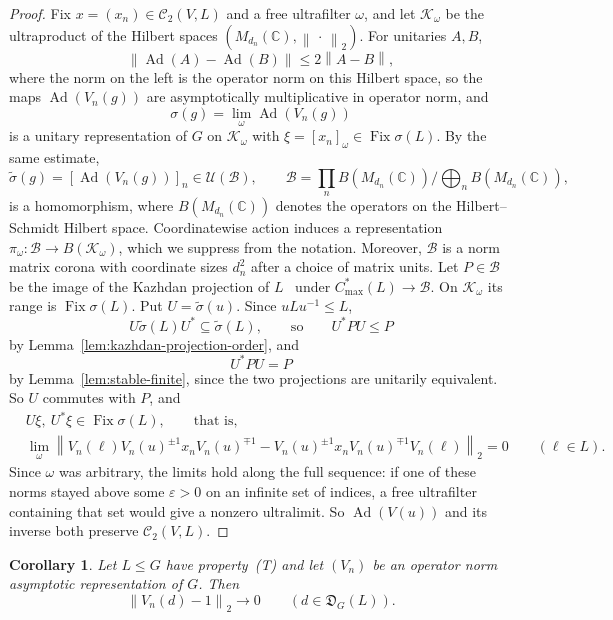 \documentclass[11pt]{amsart}
\newcommand{\leanverified}[2]{\ignorespaces}
\newtheorem{corollary}[theorem]{Corollary}
\theoremstyle{plain}
\newcommand{\C}{\mathbb C}
\newcommand{\U}{\mathcal U}
\newcommand{\opnorm}[1]{\left\lVert #1\right\rVert}
\newcommand{\hsnorm}[1]{\left\lVert #1\right\rVert_2}
\begin{document}
\begin{proof}
Fix $x=(x_n)\in\mathcal C_2(V,L)$ and a free ultrafilter $\omega$, and let
$\mathcal K_\omega$ be the ultraproduct of the Hilbert spaces
$(M_{d_n}(\C),\hsnorm{\,\cdot\,})$.  For unitaries $A,B$,
\[
 \opnorm{\operatorname{Ad}(A)-\operatorname{Ad}(B)}\le2\opnorm{A-B},
\]
where the norm on the left is the operator norm on this Hilbert space,
so the maps $\operatorname{Ad}(V_n(g))$ are asymptotically multiplicative
in operator norm, and
\[
 \sigma(g)=\lim_\omega\operatorname{Ad}(V_n(g))
\]
is a unitary representation of $G$ on $\mathcal K_\omega$ with
$\xi=[x_n]_\omega\in\operatorname{Fix}\sigma(L)$.  By the same estimate,
\[
 \widetilde\sigma(g)=[\operatorname{Ad}(V_n(g))]_n\in\U(\mathcal B),
 \qquad
 \mathcal B=\prod_nB(M_{d_n}(\C))\big/\bigoplus_nB(M_{d_n}(\C)),
\]
is a homomorphism, where $B(M_{d_n}(\C))$ denotes the operators on the
Hilbert--Schmidt Hilbert space.  Coordinatewise action induces a
representation $\pi_\omega\colon\mathcal B\to B(\mathcal K_\omega)$, which
we suppress from the notation.  Moreover, $\mathcal B$ is a norm matrix
corona with coordinate sizes $d_n^2$ after a choice of matrix units.  Let
$P\in\mathcal B$ be the image of the Kazhdan projection of
$L$~\cite{AkemannWalter} under
$C^*_{\max}(L)\to\mathcal B$.  On $\mathcal K_\omega$ its range is
$\operatorname{Fix}\sigma(L)$.  Put $U=\widetilde\sigma(u)$.  Since
$uLu^{-1}\le L$,
\[
 U\widetilde\sigma(L)U^*\subseteq\widetilde\sigma(L),
 \qquad\text{so}\qquad
 U^*PU\le P
\]
by Lemma~\ref{lem:kazhdan-projection-order}, and
\[
 U^*PU=P
\]
by Lemma~\ref{lem:stable-finite}, since the two projections are unitarily
equivalent.  So $U$ commutes with $P$, and
\[
\begin{aligned}
 &U\xi,\ U^*\xi\in\operatorname{Fix}\sigma(L),\qquad\text{that is,}\\
 &\lim_\omega\hsnorm{V_n(\ell)V_n(u)^{\pm1}x_nV_n(u)^{\mp1}
 -V_n(u)^{\pm1}x_nV_n(u)^{\mp1}V_n(\ell)}=0
 \qquad(\ell\in L).
\end{aligned}
\]
Since $\omega$ was arbitrary, the limits hold along the full sequence:
if one of these norms stayed above some $\varepsilon>0$ on an infinite
set of indices, a free ultrafilter containing that set would give a
nonzero ultralimit.  So $\operatorname{Ad}(V(u))$ and its inverse both
preserve $\mathcal C_2(V,L)$.
\end{proof}

\begin{corollary}\label{cor:defect-hs}
Let $L\le G$ have property~\textup{(T)} and let $(V_n)$ be an operator
norm asymptotic representation of $G$.  Then
\[
 \hsnorm{V_n(d)-1}\longrightarrow0
 \qquad(d\in\mathfrak D_G(L)).
\]
\leanverified{Manuscript/OneSidedMFRadical/DefectHS}{GroupApproximation.Manuscript.OneSidedMFRadical.manuscriptCompressionDefectHSInvisible}
\leanverified{Manuscript/OneSidedMFRadical/PrintedDefectShadow}{GroupApproximation.Manuscript.OneSidedMFRadical.manuscriptPrintedDefectShadowInclusion}
\end{corollary}
\end{document}
